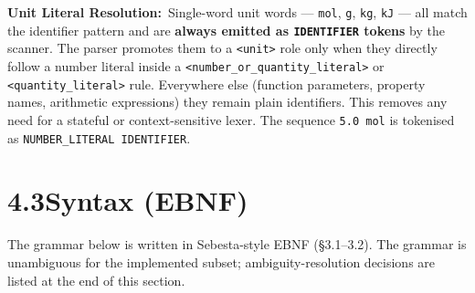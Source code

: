 \documentclass[11pt,a4paper]{article}
\newcommand{\code}[1]{\texttt{#1}}
\begin{document}
\textbf{Unit Literal Resolution:}\, Single-word unit words --- \code{mol}, \code{g}, \code{kg}, \code{kJ} --- all match the identifier pattern and are \textbf{always emitted as \code{IDENTIFIER} tokens} by the scanner. The parser promotes them to a \code{<unit>} role only when they directly follow a number literal inside a \code{<number\_or\_quantity\_literal>} or \code{<quantity\_literal>} rule. Everywhere else (function parameters, property names, arithmetic expressions) they remain plain identifiers. This removes any need for a stateful or context-sensitive lexer. The sequence \code{5.0 mol} is tokenised as \code{NUMBER\_LITERAL IDENTIFIER}.

\newpage
\section{4.3\quad Syntax (EBNF)}

The grammar below is written in Sebesta-style EBNF (\S3.1--3.2). The grammar is unambiguous for the implemented subset; ambiguity-resolution decisions are listed at the end of this section.
\end{document}
